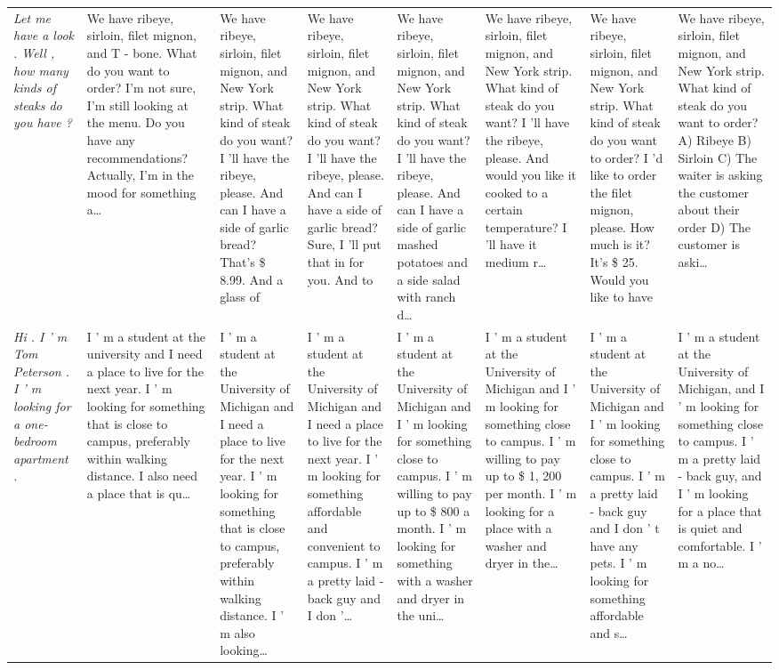 \begin{table}[t]
\begin{tabularx}{\textwidth}{p{} X X X X X X X}
\textit{Let me have a look . Well , how many kinds of steaks do you have ?} & We have ribeye, sirloin, filet mignon, and T - bone. What do you want to order? I'm not sure, I'm still looking at the menu. Do you have any recommendations? Actually, I'm in the mood for something a… & We have ribeye, sirloin, filet mignon, and New York strip. What kind of steak do you want? I 'll have the ribeye, please. And can I have a side of garlic bread? That's \$ 8.99. And a glass of & We have ribeye, sirloin, filet mignon, and New York strip. What kind of steak do you want? I 'll have the ribeye, please. And can I have a side of garlic bread? Sure, I 'll put that in for you. And to & We have ribeye, sirloin, filet mignon, and New York strip. What kind of steak do you want? I 'll have the ribeye, please. And can I have a side of garlic mashed potatoes and a side salad with ranch d… & We have ribeye, sirloin, filet mignon, and New York strip. What kind of steak do you want? I 'll have the ribeye, please. And would you like it cooked to a certain temperature? I 'll have it medium r… & We have ribeye, sirloin, filet mignon, and New York strip. What kind of steak do you want to order? I 'd like to order the filet mignon, please. How much is it? It's \$ 25. Would you like to have & We have ribeye, sirloin, filet mignon, and New York strip. What kind of steak do you want to order? A) Ribeye B) Sirloin C) The waiter is asking the customer about their order D) The customer is aski… \\
\textit{Hi . I ’ m Tom Peterson . I ’ m looking for a one-bedroom apartment .} & I ’ m a student at the university and I need a place to live for the next year. I ’ m looking for something that is close to campus, preferably within walking distance. I also need a place that is qu… & I ’ m a student at the University of Michigan and I need a place to live for the next year. I ’ m looking for something that is close to campus, preferably within walking distance. I ’ m also looking… & I ’ m a student at the University of Michigan and I need a place to live for the next year. I ’ m looking for something affordable and convenient to campus. I ’ m a pretty laid - back guy and I don ’… & I ’ m a student at the University of Michigan and I ’ m looking for something close to campus. I ’ m willing to pay up to \$ 800 a month. I ’ m looking for something with a washer and dryer in the uni… & I ’ m a student at the University of Michigan and I ’ m looking for something close to campus. I ’ m willing to pay up to \$ 1, 200 per month. I ’ m looking for a place with a washer and dryer in the… & I ’ m a student at the University of Michigan and I ’ m looking for something close to campus. I ’ m a pretty laid - back guy and I don ’ t have any pets. I ’ m looking for something affordable and s… & I ’ m a student at the University of Michigan, and I ’ m looking for something close to campus. I ’ m a pretty laid - back guy, and I ’ m looking for a place that is quiet and comfortable. I ’ m a no… \\
\bottomrule
\end{tabularx}
\end{table}
